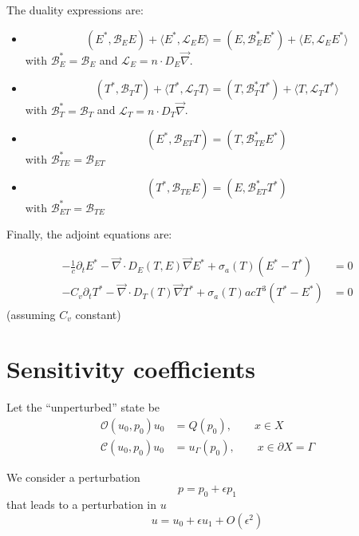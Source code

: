 \documentclass[11pt]{article}
\renewcommand{\div}{\vec{\nabla}\! \cdot \!}
\newcommand{\grad}{\vec{\nabla}}
\newcommand{\be}{\begin{equation}}
\newcommand{\ee}{\end{equation}}
\renewcommand{\O}{\mathcal{O}}
\newcommand{\mc}[1]{\mathcal{#1}}
\begin{document}
The duality expressions are:
\begin{itemize}

\item
\be
(E^\ast, \mc{B}_{E}E) + \langle E^\ast, \mc{L}_E E \rangle = (E, \mc{B}_{E}^\ast E^\ast) + \langle E, \mc{L}_E E^\ast \rangle 
\ee
with $\mc{B}_{E}^\ast = \mc{B}_{E}$ and $\mc{L}_E = n \cdot D_E \grad$.

\item
\be
(T^\ast, \mc{B}_{T}T) + \langle T^\ast, \mc{L}_T T \rangle = (T, \mc{B}_{T}^\ast T^\ast) + \langle T, \mc{L}_T T^\ast \rangle 
\ee
with $\mc{B}_{T}^\ast = \mc{B}_{T}$ and $\mc{L}_T = n \cdot D_T \grad$.

\item
\be
(E^\ast, \mc{B}_{ET}T)  = (T, \mc{B}_{TE}^\ast E^\ast) 
\ee
with $\mc{B}_{TE}^\ast = \mc{B}_{ET}$

\item
\be
(T^\ast, \mc{B}_{TE}E)  = (E, \mc{B}_{ET}^\ast T^\ast) 
\ee
with $\mc{B}_{ET}^\ast = \mc{B}_{TE}$

\end{itemize}

Finally, the adjoint equations are:

\begin{align}
-\frac{1}{c} \partial_t E^\ast - \div D_E(T,E) \grad E^\ast + \sigma_a(T)(E^\ast-T^\ast) &= 0 \\
-C_v \partial_t T^\ast -\div D_T(T) \grad T^\ast +\sigma_a(T)acT^3(T^\ast-E^\ast)            &= 0
\end{align}
(assuming $C_v$ constant)

\section{Sensitivity coefficients}
Let the ``unperturbed'' state be
\begin{align}
\O(u_0,p_0) u_0 &= Q(p_0), \qquad x\in X \\
\mc{C}(u_0,p_0) u_0 &=u_\Gamma(p_0), \qquad x \in \partial X=\Gamma
\end{align}

We consider a perturbation
\be
p = p_0 + \epsilon p_1
\ee
that leads to a perturbation in $u$
\be
u=u_0 + \epsilon u_1 + O(\epsilon ^2)
\ee
\end{document}
